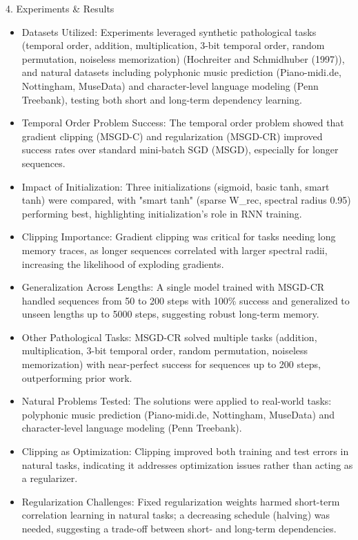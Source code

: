 \begin{frame}[t]
\begin{columns}[t,totalwidth=\textwidth]
\begin{column}{0.3\textwidth}
\begin{block}{4. Experiments \& Results}
  \small{
  \begin{itemize}
    \item Datasets Utilized: Experiments leveraged synthetic pathological tasks (temporal order, addition, multiplication, 3-bit temporal order, random permutation, noiseless memorization) (Hochreiter and Schmidhuber (1997)), and natural datasets including polyphonic music prediction (Piano-midi.de, Nottingham, MuseData) and character-level language modeling (Penn Treebank), testing both short and long-term dependency learning.
    \item Temporal Order Problem Success: The temporal order problem showed that gradient clipping (MSGD-C) and regularization (MSGD-CR) improved success rates over standard mini-batch SGD (MSGD), especially for longer sequences.
    \item Impact of Initialization: Three initializations (sigmoid, basic tanh, smart tanh) were compared, with "smart tanh" (sparse W\_rec, spectral radius 0.95) performing best, highlighting initialization's role in RNN training.
    \item Clipping Importance: Gradient clipping was critical for tasks needing long memory traces, as longer sequences correlated with larger spectral radii, increasing the likelihood of exploding gradients.
    \item Generalization Across Lengths: A single model trained with MSGD-CR handled sequences from 50 to 200 steps with 100\% success and generalized to unseen lengths up to 5000 steps, suggesting robust long-term memory. 
    \item Other Pathological Tasks: MSGD-CR solved multiple tasks (addition, multiplication, 3-bit temporal order, random permutation, noiseless memorization) with near-perfect success for sequences up to 200 steps, outperforming prior work. 
    \item Natural Problems Tested: The solutions were applied to real-world tasks: polyphonic music prediction (Piano-midi.de, Nottingham, MuseData) and character-level language modeling (Penn Treebank). 
    \item Clipping as Optimization: Clipping improved both training and test errors in natural tasks, indicating it addresses optimization issues rather than acting as a regularizer. 
    \item Regularization Challenges: Fixed regularization weights harmed short-term correlation learning in natural tasks; a decreasing schedule (halving) was needed, suggesting a trade-off between short- and long-term dependencies. 

\end{itemize}}
\end{block}
\end{column}
\end{columns}
\end{frame}
